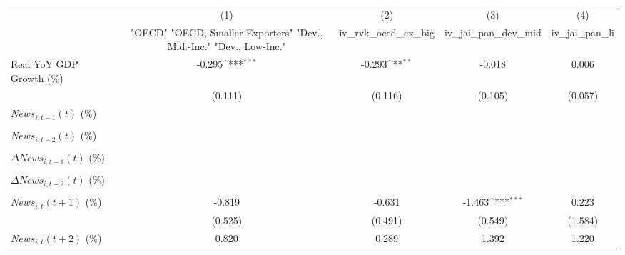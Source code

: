 {
\def\sym#1{\ifmmode^{#1}\else\(^{#1}\)\fi}
\begin{tabular}{l*{4}{c}}
\toprule
                    &\multicolumn{1}{c}{(1)}&\multicolumn{1}{c}{(2)}&\multicolumn{1}{c}{(3)}&\multicolumn{1}{c}{(4)}\\
                    &\multicolumn{1}{c}{ "OECD" "OECD, Smaller Exporters" "Dev., Mid.-Inc." "Dev., Low-Inc."}&\multicolumn{1}{c}{iv_rvk_oecd_ex_big}&\multicolumn{1}{c}{iv_jai_pan_dev_mid}&\multicolumn{1}{c}{iv_jai_pan_li}\\
\midrule
Real YoY GDP Growth (\%)&      -0.295\sym{***}&      -0.293\sym{**} &      -0.018         &       0.006         \\
                    &     (0.111)         &     (0.116)         &     (0.105)         &     (0.057)         \\
\addlinespace
$ News_{i,t-1}(t)$ (\%)&                     &                     &                     &                     \\
                    &                     &                     &                     &                     \\
\addlinespace
$ News_{i,t-2}(t)$ (\%)&                     &                     &                     &                     \\
                    &                     &                     &                     &                     \\
\addlinespace
$ \Delta News_{i,t-1}(t)$ (\%)&                     &                     &                     &                     \\
                    &                     &                     &                     &                     \\
\addlinespace
$ \Delta News_{i,t-2}(t)$ (\%)&                     &                     &                     &                     \\
                    &                     &                     &                     &                     \\
\addlinespace
$ News_{i,t}(t+1)$ (\%)&      -0.819         &      -0.631         &      -1.463\sym{***}&       0.223         \\
                    &     (0.525)         &     (0.491)         &     (0.549)         &     (1.584)         \\
\addlinespace
$ News_{i,t}(t+2)$ (\%)&       0.820         &       0.289         &       1.392         &       1.220         \\

\end{tabular}}
